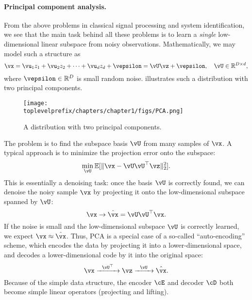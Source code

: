 \documentclass[../../book-main.tex]{subfiles}
\begin{document}
\paragraph{Principal component analysis.}
From the above problems in classical signal processing and system identification, we see that the main task behind all these problems is to learn a \textit{single} low-dimensional linear subspace from noisy observations. Mathematically, we may model such a structure as
\begin{equation}
    \vx = \vu_{1} z_{1} + \vu_{2} z_{2} + \cdots + \vu_{d} z_{d} + \vepsilon =  \vU \vz + \vepsilon, \quad \vU \in \R^{D\times d},
    \label{eqn:PCA-model}
\end{equation}
where \(\vepsilon \in \R^{D}\) is small random noise.  illustrates such a distribution with two principal components.
\begin{figure}
    \centering
    \texttt{[image: \\toplevelprefix/chapters/chapter1/figs/PCA.png]}
    \caption{A distribution with two principal components.}
    \label{fig:PCA}
\end{figure}
The problem is to find the subspace basis \(\vU\) from many samples of \(\vx\). A typical approach is to minimize the projection error onto the subspace:
\begin{equation}
    \min_{\vU}\Ex[\|\vx - \vU\vU^{\top} \vz\|_{2}^{2}].
\end{equation}
This is essentially a denoising task: once the basis \(\vU\) is correctly found, we can denoise the noisy sample \(\vx\) by projecting it onto the low-dimensional subspace spanned by \(\vU\):
\begin{equation}
\vx \rightarrow \hat{\vx} = \vU\vU^{\top} \vx. 
\end{equation}
If the noise is small and the low-dimensional subspace \(\vU\) is correctly learned, we expect \(\vx \approx \hat{\vx}\). Thus, PCA is a special case of a so-called ``auto-encoding'' scheme, which encodes the data by projecting it into a lower-dimensional space, and decodes a lower-dimensional code by it into the original space:
\begin{equation}
    \vx   \xrightarrow{\hspace{2mm} \vU^{\top}\hspace{2mm}} \vz  \xrightarrow{\hspace{2mm} \vU \hspace{2mm}} \hat{\vx}.
       \label{eqn:auto-encoding-PCA}
\end{equation}
Because of the simple data structure, the encoder \(\cE\) and decoder \(\cD\) both become simple linear operators (projecting and lifting).
\end{document}
